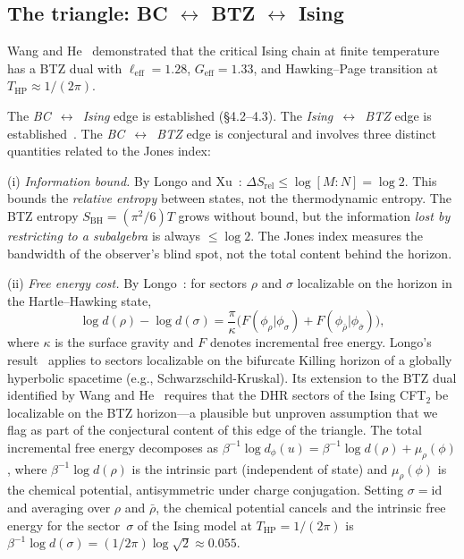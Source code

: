 \documentclass[aps,prl,twocolumn,superscriptaddress,showpacs]{revtex4-2}
\begin{document}
\subsection{The triangle: BC $\leftrightarrow$ BTZ $\leftrightarrow$ Ising}

Wang and He~\cite{WangHe2026} demonstrated that the critical Ising chain at finite temperature has a BTZ dual with $\ell_{\mathrm{eff}} = 1.28$, $G_{\mathrm{eff}} = 1.33$, and Hawking--Page transition at $T_{\mathrm{HP}} \approx 1/(2\pi)$.

The \textit{BC~$\leftrightarrow$~Ising} edge is established (\S4.2--4.3). The \textit{Ising~$\leftrightarrow$~BTZ} edge is established~\cite{WangHe2026}. The \textit{BC~$\leftrightarrow$~BTZ} edge is conjectural and involves three distinct quantities related to the Jones index:

(i) \textit{Information bound.} By Longo and Xu~\cite{LongoXu2018}: $\Delta S_{\mathrm{rel}} \leq \log [M{:}N] = \log 2$. This bounds the \textit{relative entropy} between states, not the thermodynamic entropy. The BTZ entropy $S_{\mathrm{BH}} = (\pi^2/6)T$ grows without bound, but the information \textit{lost by restricting to a subalgebra} is always $\leq \log 2$. The Jones index measures the bandwidth of the observer's blind spot, not the total content behind the horizon.

(ii) \textit{Free energy cost.} By Longo~\cite[Sec.~5]{Longo2001}: for sectors $\rho$ and $\sigma$ localizable on the horizon in the Hartle--Hawking state,
\[
\log d(\rho) - \log d(\sigma) = \frac{\pi}{\kappa}\bigl(F(\phi_\rho|\phi_\sigma) + F(\phi_{\bar\rho}|\phi_{\bar\sigma})\bigr),
\]
where $\kappa$ is the surface gravity and $F$ denotes incremental free energy. Longo's result~\cite{Longo2001} applies to sectors localizable on the bifurcate Killing horizon of a globally hyperbolic spacetime (e.g., Schwarzschild-Kruskal). Its extension to the BTZ dual identified by Wang and He~\cite{WangHe2026} requires that the DHR sectors of the Ising CFT$_2$ be localizable on the BTZ horizon---a plausible but unproven assumption that we flag as part of the conjectural content of this edge of the triangle. The total incremental free energy decomposes as $\beta^{-1}\log d_\phi(u) = \beta^{-1}\log d(\rho) + \mu_\rho(\phi)$, where $\beta^{-1}\log d(\rho)$ is the intrinsic part (independent of state) and $\mu_\rho(\phi)$ is the chemical potential, antisymmetric under charge conjugation. Setting $\sigma = \mathrm{id}$ and averaging over $\rho$ and $\bar\rho$, the chemical potential cancels and the intrinsic free energy for the sector~$\sigma$ of the Ising model at $T_{\mathrm{HP}} = 1/(2\pi)$ is $\beta^{-1}\log d(\sigma) = (1/2\pi)\log\sqrt{2} \approx 0.055$.
\end{document}
